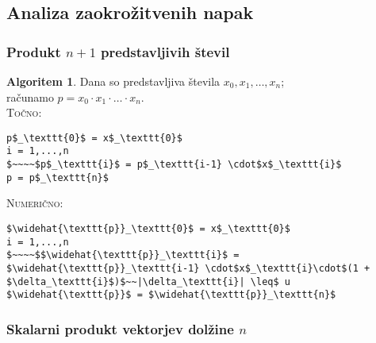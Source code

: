 \documentclass[11pt]{article}
\theoremstyle{definition}
\newtheorem*{algoritem}{Algoritem}
\begin{document}

\subsection{Analiza zaokrožitvenih napak}
\vspace{0.5cm}

\subsubsection{Produkt $n+1$ predstavljivih števil}

\begin{algoritem}

Dana so predstavljiva števila $x_0, x_1, \ldots, x_n$; \\ računamo $p = x_0 \cdot x_1 \cdot \ldots \cdot x_n$. \\

\noindent \textsc{Točno}:
\begin{lstlisting}
p$_\texttt{0}$ = x$_\texttt{0}$
i = 1,...,n
$~~~~$p$_\texttt{i}$ = p$_\texttt{i-1} \cdot$x$_\texttt{i}$
p = p$_\texttt{n}$
\end{lstlisting} 

\noindent \textsc{Numerično}:
\begin{lstlisting}
$\widehat{\texttt{p}}_\texttt{0}$ = x$_\texttt{0}$
i = 1,...,n
$~~~~$$\widehat{\texttt{p}}_\texttt{i}$ = $\widehat{\texttt{p}}_\texttt{i-1} \cdot$x$_\texttt{i}\cdot$(1 + $\delta_\texttt{i}$)$~~|\delta_\texttt{i}| \leq$ u
$\widehat{\texttt{p}}$ = $\widehat{\texttt{p}}_\texttt{n}$
\end{lstlisting}

\end{algoritem}
\vspace{0.5cm}
\pagebreak

\subsubsection{Skalarni produkt vektorjev dolžine $n$}
\end{document}
